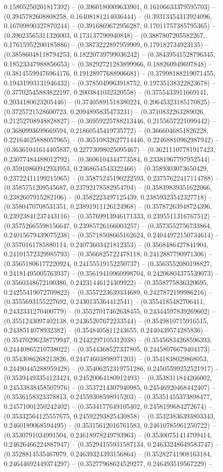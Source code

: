 0.15805250201817392) -- (0.3960180009633901, 0.16106633379595703) -- (0.3945782608808258, 0.16408181214036444) -- (0.39313454313924096, 0.16709890327870244) -- (0.3916869672956287, 0.17011757385795365) -- (0.39023565311326003, 0.173137790940848) -- (0.3887807205582267, 0.17615952200185886) -- (0.3873222897959909, 0.179182734923135) -- (0.38586048118794253, 0.18220739799036242) -- (0.38439541528796345, 0.18523347988856653) -- (0.38292721283899966, 0.188260949697848) -- (0.38145599476964176, 0.19128977688906681) -- (0.37998188219071455, 0.19431993131946432) -- (0.3785049963918752, 0.19735138322823678) -- (0.37702545883822197, 0.2003841032320558) -- (0.3755433911669141, 0.2034180623205446) -- (0.37405891518380224, 0.20645323185170825) -- (0.3725721528600723, 0.2094895835473231) -- (0.3710832263289026, 0.21252708948828827) -- (0.36959225788213446, 0.2155657221099442) -- (0.3680993699669594, 0.21860545419735772) -- (0.3666046851826228, 0.22164625888057965) -- (0.36510832627714446, 0.22468810962987942) -- (0.36361041614405837, 0.22773098025095467) -- (0.36211107781917423, 0.23077484488012792) -- (0.3606104344773584, 0.23381967797952544) -- (0.35910860942933953, 0.2368654543322466) -- (0.3589303073650429, 0.23722411199215965) -- (0.35875245190222593, 0.23757622417114788) -- (0.3585751209545687, 0.23792178582954704) -- (0.35839839351622066, 0.2382607915282106) -- (0.3582223497125439, 0.23859323542327718) -- (0.3580470708531351, 0.23891911126124968) -- (0.35787263948724396, 0.23923841237443116) -- (0.35769913946171333, 0.2395511316767512) -- (0.35752665598156647, 0.23985726166003257) -- (0.3573552756733864, 0.24015679439075238) -- (0.35718508665162624, 0.24044972150734614) -- (0.3570161785880114, 0.24073603421812353) -- (0.3568486427841904, 0.24101572329985793) -- (0.3566825722478118, 0.2412887790971306) -- (0.35651806177220924, 0.24155519152250737) -- (0.3563552080198827, 0.24181495005763937) -- (0.35619410960998704, 0.24206804375539073) -- (0.3560348672100386, 0.24231446124309922) -- (0.3558775836320695, 0.24255419072709822) -- (0.3557223639334689, 0.2427872199986216) -- (0.3555693155227692, 0.2430135364412541) -- (0.3554185482706411, 0.2432331270400779) -- (0.35527017462638455, 0.24344597839269602) -- (0.3551243097402138, 0.24365207672233544) -- (0.3549810715916515, 0.2438514078932382) -- (0.3548405811243655, 0.2440439574285836) -- (0.35470296238779947, 0.2442297105312038) -- (0.35456834268596393, 0.24440865210738022) -- (0.3544368527337805, 0.24458076679404173) -- (0.3543086268213826, 0.24474603898971203) -- (0.3541838029868053, 0.24490445288959428) -- (0.35406252319751286, 0.24505599252521917) -- (0.35394493354123424, 0.24520064180912493) -- (0.3538311844266002, 0.24533838458507976) -- (0.3537214307940985, 0.24546920468442407) -- (0.3536158323378813, 0.24559308598915203) -- (0.35351455373898477, 0.24571001250242402) -- (0.3534177649105402, 0.2458199684272674) -- (0.35332564125557675, 0.24592293825430858) -- (0.35323836393803343, 0.2460189068594495) -- (0.35315612016761583, 0.24610785961250722) -- (0.3530791034991504, 0.24618978249793963) -- (0.35300751414709414, 0.24626466224887947) -- (0.35294155931587134, 0.24633248649583747) -- (0.3528814535467079, 0.24639324393156864) -- (0.35282741908163184, 0.24644692449374297) -- (0.35277968624529277, 0.246493519567229) -- 